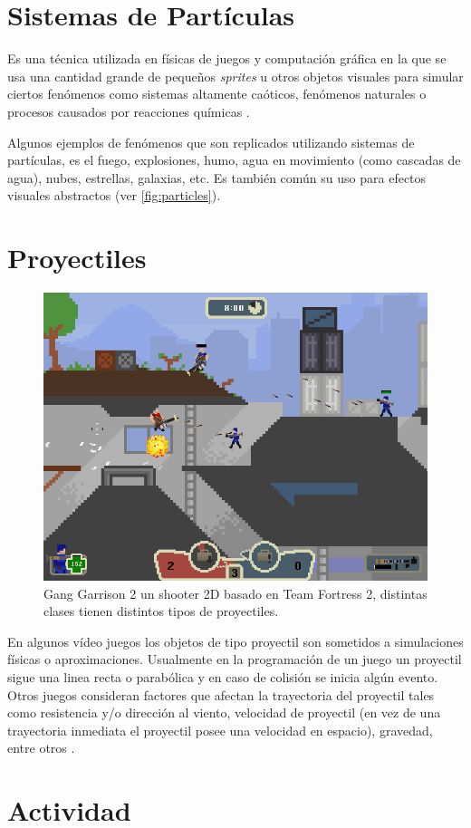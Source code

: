 \section{Sistemas de Partículas}
Es una técnica utilizada en físicas de juegos y computación gráfica en la que se usa una cantidad grande de pequeños \emph{sprites} u otros objetos visuales para simular ciertos fenómenos como sistemas altamente caóticos, fenómenos naturales o procesos causados por reacciones químicas \cite{vanderburg_particlesystem}. 

Algunos ejemplos de fenómenos que son replicados utilizando sistemas de partículas, es el fuego, explosiones, humo, agua en movimiento (como cascadas de agua), nubes, estrellas, galaxias, etc. Es también común su uso para efectos visuales abstractos (ver \ref{fig:particles}).
\section{Proyectiles}
\setlength\intextsep{0pt}
\begin{figure}
\includegraphics[width=\linewidth]{semana14/Gang_Garrison_2.png}
\caption{Gang Garrison 2 un shooter 2D basado en Team Fortress 2, distintas clases tienen distintos tipos de proyectiles.}
\label{fig:ganggarrison2}
\end{figure}

En algunos vídeo juegos los objetos de tipo proyectil son sometidos a simulaciones físicas o aproximaciones. Usualmente en la programación de un juego un proyectil sigue una linea recta o parabólica y en caso de colisión se inicia algún evento. Otros juegos consideran factores que afectan la trayectoria del proyectil tales como resistencia y/o dirección al viento, velocidad de proyectil (en vez de una trayectoria inmediata el proyectil posee una velocidad en espacio), gravedad, entre otros \cite{fifa_physics}.~\\

\section{Actividad}
